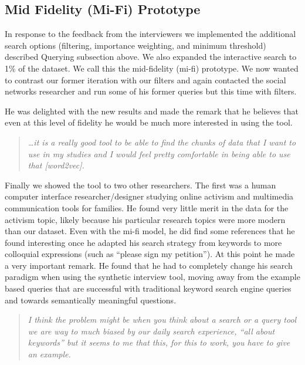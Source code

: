 \documentclass{sigchi}
\begin{document}
\subsection{Mid Fidelity (Mi-Fi) Prototype}
In response to the feedback from the interviewers we implemented the additional search options (filtering, importance weighting, and minimum threshold) described Querying subsection above. We also expanded the interactive search to 1\% of the dataset. We call this the mid-fidelity (mi-fi) prototype. We now wanted to contrast our former iteration with our filters and again contacted the social networks researcher and run some of his former queries but this time with filters. 

He was delighted with the new results and made the remark that he believes that even at this level of fidelity he would be much more interested in using the tool.
\begin{quote}
{\em
\dots it is a really good tool to be able to find the chunks of data that I want to use in my studies and I would feel pretty comfortable in being able to use that [word2vec].}
\end{quote}

Finally we showed the tool to two other researchers. The first was a human computer interface researcher/designer studying online activism and multimedia communication tools for families. He found very little merit in the data for the activism topic, likely because his particular research topics were more modern than our dataset. Even with the mi-fi model, he did find some references that he found interesting once he adapted his search strategy from keywords to more colloquial expressions (such as ``please sign my petition''). At this point he made a very important remark. He found that he had to completely change his search paradigm when using the synthetic interview tool, moving away from the example based queries that are successful with traditional keyword search engine queries and towards semantically meaningful questions. 

\begin{quote}
{\em
I think the problem might be when you think about a search or a query tool we are way to much biased by our daily search experience, ``all about keywords'' but it seems to me that this, for this to work, you have to give an example.
}\end{quote}
\end{document}
